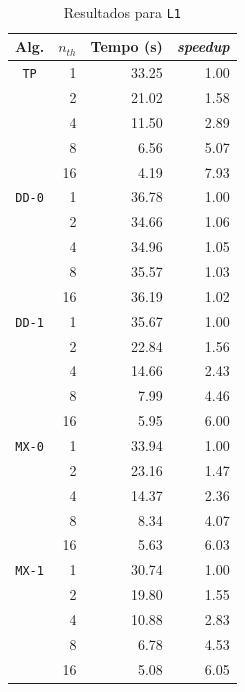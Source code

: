 \documentclass[10pt,a4paper,oneside]{article}
\begin{document}
\begin{table}[t]
\begin{subtable}[b]{0.49\textwidth}
    \label{tbl:m1}
  \end{subtable}
  ~
  \begin{subtable}[b]{0.49\textwidth}
    \centering
    \scriptsize
    \begin{tabular}{|l|r|r|r|}
      \hline
      Alg. & $n_{th}$ & Tempo (s) & {\it speedup} \\ \hline
      \multicolumn{1}{|c|}{{\tt TP}} & 1 & 33.25 & 1.00 \\ \cline{ 2- 4}
                             & 2 & 21.02 & 1.58 \\ \cline{ 2- 4}
                             & 4 & 11.50 & 2.89 \\ \cline{ 2- 4}
                             & 8 & 6.56 & 5.07 \\ \cline{ 2- 4}
                             & 16 & 4.19 & 7.93 \\ \hline
      \multicolumn{ 1}{|c|}{{\tt DD-0}} & 1 & 36.78 & 1.00 \\ \cline{ 2- 4}
                             & 2 & 34.66 & 1.06 \\ \cline{ 2- 4}
                             & 4 & 34.96 & 1.05 \\ \cline{ 2- 4}
                             & 8 & 35.57 & 1.03 \\ \cline{ 2- 4}
                             & 16 & 36.19 & 1.02 \\ \hline
      \multicolumn{ 1}{|c|}{{\tt DD-1}} & 1 & 35.67 & 1.00 \\ \cline{ 2- 4}
                             & 2 & 22.84 & 1.56 \\ \cline{ 2- 4}
                             & 4 & 14.66 & 2.43 \\ \cline{ 2- 4}
                             & 8 & 7.99 & 4.46 \\ \cline{ 2- 4}
                             & 16 & 5.95 & 6.00 \\ \hline
      \multicolumn{ 1}{|c|}{{\tt MX-0}} & 1 & 33.94 & 1.00 \\ \cline{ 2- 4}
                             & 2 & 23.16 & 1.47 \\ \cline{ 2- 4}
                             & 4 & 14.37 & 2.36 \\ \cline{ 2- 4}
                             & 8 & 8.34 & 4.07 \\ \cline{ 2- 4}
                             & 16 & 5.63 & 6.03 \\ \hline
      \multicolumn{ 1}{|c|}{{\tt MX-1}} & 1 & 30.74 & 1.00 \\ \cline{ 2- 4}
                             & 2 & 19.80 & 1.55 \\ \cline{ 2- 4}
                             & 4 & 10.88 & 2.83 \\ \cline{ 2- 4}
                             & 8 & 6.78 & 4.53 \\ \cline{ 2- 4}
                             & 16 & 5.08 & 6.05 \\ \hline
    \end{tabular}
    \caption{Resultados para {\tt L1}}
    \label{tbl:l1}
  \end{subtable}
\end{table}
\end{document}
